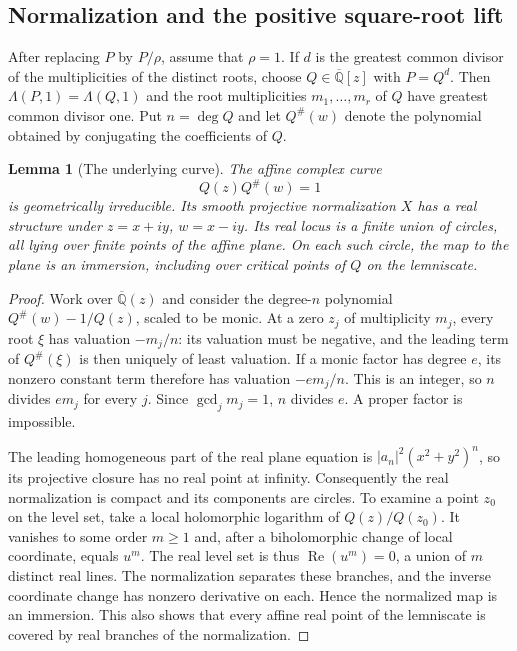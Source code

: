 \documentclass[11pt,a4paper]{article}
\newtheorem{lemma}[theorem]{Lemma}
\theoremstyle{definition}
\theoremstyle{remark}
\numberwithin{equation}{section}
\newcommand{\Qbar}{\overline{\mathbb Q}}
\begin{document}
\subsection{Normalization and the positive square-root lift}

After replacing $P$ by $P/\rho$, assume that $\rho=1$.  If $d$ is the
greatest common divisor of the multiplicities of the distinct roots, choose
$Q\in\Qbar[z]$ with $P=Q^d$.  Then $\Lambda(P,1)=\Lambda(Q,1)$ and the
root multiplicities $m_1,\ldots,m_r$ of $Q$ have greatest common divisor
one.  Put $n=\deg Q$ and let $Q^\#(w)$ denote the polynomial obtained by
conjugating the coefficients of $Q$.

\begin{lemma}[The underlying curve]\label{lm-normalization}
The affine complex curve
\begin{equation}\label{lm-complexification}
 Q(z)Q^\#(w)=1
\end{equation}
is geometrically irreducible.  Its smooth projective normalization $X$
has a real structure under $z=x+iy$, $w=x-iy$.  Its real locus is a finite
union of circles, all lying over finite points of the affine plane.  On
each such circle, the map to the plane is an immersion, including over
critical points of $Q$ on the lemniscate.
\end{lemma}

\begin{proof}
Work over $\Qbar(z)$ and consider the degree-$n$ polynomial
$Q^\#(w)-1/Q(z)$, scaled to be monic.  At a zero $z_j$ of multiplicity
$m_j$, every root $\xi$ has valuation $-m_j/n$: its valuation must be
negative, and the leading term of $Q^\#(\xi)$ is then uniquely of least
valuation.  If a monic factor has degree $e$, its nonzero constant term
therefore has valuation $-em_j/n$.  This is an integer, so $n$ divides
$em_j$ for every $j$.  Since $\gcd_j m_j=1$, $n$ divides $e$.  A proper
factor is impossible.

The leading homogeneous part of the real plane equation is
$|a_n|^2(x^2+y^2)^n$, so its projective closure has no real point at
infinity.  Consequently the real normalization is compact and its
components are circles.  To examine a point $z_0$ on the level set, take a
local holomorphic logarithm of $Q(z)/Q(z_0)$.  It vanishes to some order
$m\ge1$ and, after a biholomorphic change of local coordinate, equals
$u^m$.  The real level set is thus
$\operatorname{Re}(u^m)=0$, a union of $m$ distinct real lines.  The
normalization separates these branches, and the inverse coordinate change
has nonzero derivative on each.  Hence the normalized map is an immersion.
This also shows that every affine real point of the lemniscate is covered
by real branches of the normalization.
\end{proof}
\end{document}
